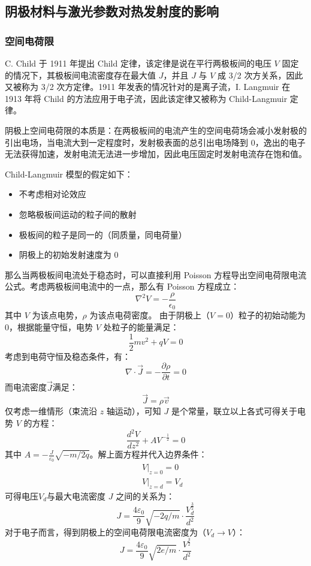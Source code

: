\subsection{阴极材料与激光参数对热发射度的影响}
\subsubsection{空间电荷限}
	C. Child 于 1911 年提出 Child 定律\cite{Child:1911aa}，该定律是说在平行两极板间的电压 $V$ 固定的情况下，其极板间电流密度存在最大值 $J$，并且 $J$ 与 $V$ 成 3/2 次方关系，因此又被称为 3/2 次方定律。1911 年发表的情况针对的是离子流，I. Langmuir 在 1913 年将 Child 的方法应用于电子流\cite{langmuir1913effect}，因此该定律又被称为 Child-Langmuir 定律。

	阴极上空间电荷限的本质是：在两极板间的电流产生的空间电荷场会减小发射极的引出电场，当电流大到一定程度时，发射极表面的总引出电场降到 0，逸出的电子无法获得加速，发射电流无法进一步增加，因此电压固定时发射电流存在饱和值。
	
	Child-Langmuir 模型的假定如下\cite{Child:1911aa,langmuir1913effect,Langmuir:1923aa}：
	\begin{itemize}
	\item 不考虑相对论效应
	\item 忽略极板间运动的粒子间的散射
	\item 极板间的粒子是同一的（同质量，同电荷量）
	\item 阴极上的初始发射速度为 0
	\end{itemize}
	那么当两极板间电流处于稳态时，可以直接利用 Poisson 方程导出空间电荷限电流公式。考虑两极板间电流中的一点，那么有 Poisson 方程成立：
	\[\nabla^2V=-\frac{\rho}{\epsilon_0}\]
	其中 $V$ 为该点电势，$\rho$ 为该点电荷密度。
	由于阴极上（$V=0$）粒子的初始动能为 0，根据能量守恒，电势 $V$ 处粒子的能量满足：
	\[\frac{1}{2}mv^2+qV=0\]
	考虑到电荷守恒及稳态条件，有：
	\[\nabla\cdot\vec{J}=-\frac{\partial \rho}{\partial t}= 0\]
	而电流密度$\vec{J}$满足：
	\[\vec{J}=\rho \vec{v}\]
	仅考虑一维情形（束流沿 $z$ 轴运动），可知 $J$ 是个常量，联立以上各式可得关于电势 $V$ 的方程：
	\[\frac{d^2V}{dz^2}+AV^{-\frac{1}{2}}=0\]
	其中 $A=-\frac{J}{\varepsilon_0}\sqrt{-m/2q}$。解上面方程并代入边界条件：
	\begin{eqnarray*}
	&&V|_{z=0}=0\\
	&&V|_{z=d}=V_d
	\end{eqnarray*}
	可得电压$V_d$与最大电流密度 $J$ 之间的关系为：
	\[J = \frac{4\varepsilon_0}{9}\sqrt{-2q/m}\cdot \frac{V_d^{\frac{3}{2}}}{d^2}\]
	对于电子而言，得到阴极上的空间电荷限电流密度为（$V_d\rightarrow V$）：
	\begin{equation}
	J = \frac{4\varepsilon_0}{9}\sqrt{2e/m}\cdot \frac{V^{\frac{3}{2}}}{d^2}
	\end{equation}

